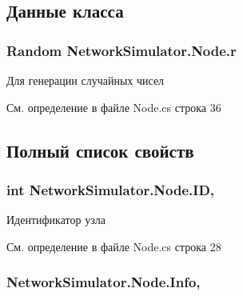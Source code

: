 \subsection{Данные класса}
\subsubsection[{\texorpdfstring{r}{r}}]{\setlength{\rightskip}{0pt plus 5cm}Random Network\+Simulator.\+Node.\+r\hspace{0.3cm}{\ttfamily [protected]}}\hypertarget{class_network_simulator_1_1_node_a3eb74310ed895ee8ec49c1850c1c405e}{}\label{class_network_simulator_1_1_node_a3eb74310ed895ee8ec49c1850c1c405e}


Для генерации случайных чисел 



См. определение в файле Node.\+cs строка 36



\subsection{Полный список свойств}
\subsubsection[{\texorpdfstring{ID}{ID}}]{\setlength{\rightskip}{0pt plus 5cm}int Network\+Simulator.\+Node.\+ID\hspace{0.3cm}{\ttfamily [get]}, {}}\hypertarget{class_network_simulator_1_1_node_a1ba068212f50babe026c527a9b5fb55a}{}\label{class_network_simulator_1_1_node_a1ba068212f50babe026c527a9b5fb55a}


Идентификатор узла 



См. определение в файле Node.\+cs строка 28

\subsubsection[{\texorpdfstring{Info}{Info}}]{ Network\+Simulator.\+Node.\+Info\hspace{0.3cm}{\ttfamily [get]}, {}}\hypertarget{class_network_simulator_1_1_node_a63e706d7158c6ea84ea8fdbe61d9bffb}{}\label{class_network_simulator_1_1_node_a63e706d7158c6ea84ea8fdbe61d9bffb}


